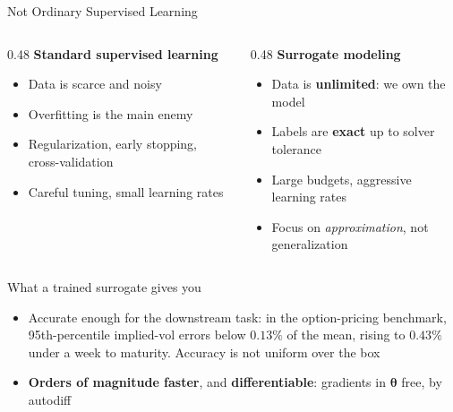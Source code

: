 \documentclass[aspectratio=169,11pt]{beamer}
\newcommand{\emphc}[1]{\textcolor{harvardcrimson}{#1}}
\newcommand{\str}{\bm{\theta}}          %
\begin{document}
\begin{frame}{Not Ordinary Supervised Learning}
\small
\begin{columns}[T]
\begin{column}{0.48\textwidth}
\textbf{Standard supervised learning}
\begin{itemize}\itemsep1pt
  \item Data is scarce and noisy
  \item Overfitting is the main enemy
  \item Regularization, early stopping, cross-validation
  \item Careful tuning, small learning rates
\end{itemize}
\end{column}
\begin{column}{0.48\textwidth}
\textbf{Surrogate modeling}
\begin{itemize}\itemsep1pt
  \item Data is \textbf{unlimited}: we own the model
  \item Labels are \textbf{exact} up to solver tolerance
  \item Large budgets, aggressive learning rates
  \item Focus on \emph{approximation}, not generalization
\end{itemize}
\end{column}
\end{columns}

\vspace{0.3cm}
\begin{block}{What a trained surrogate gives you}
\begin{itemize}\itemsep1pt
  \item \emphc{Accurate enough for the downstream task}: in the option-pricing benchmark, 95th-percentile implied-vol errors below $0.13\%$ of the mean, rising to $0.43\%$ under a week to maturity. \emphc{Accuracy is not uniform over the box}
  \item \textbf{Orders of magnitude faster}, and \textbf{differentiable}: gradients in $\str$ free, by autodiff
\end{itemize}
\end{block}
\end{frame}
\end{document}
